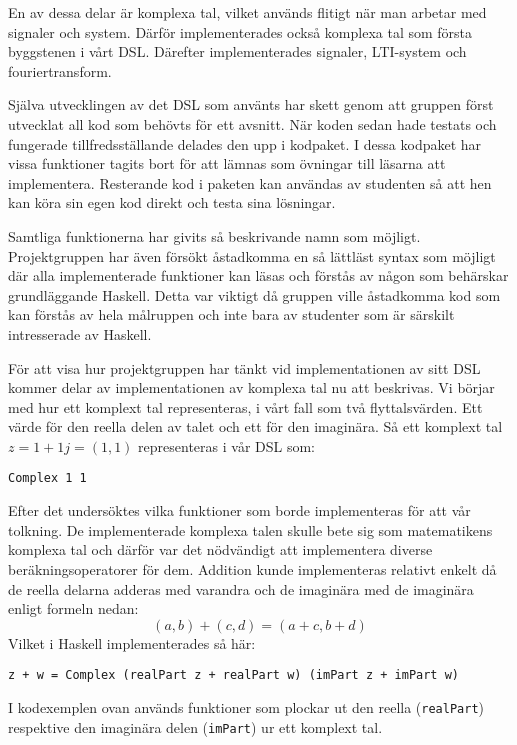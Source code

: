 \documentclass[]{article}
\begin{document}
En av dessa delar är komplexa tal, vilket används flitigt när man arbetar med
signaler och system. Därför implementerades också komplexa tal som första byggstenen
i vårt DSL. Därefter implementerades signaler, LTI-system och fouriertransform.

Själva utvecklingen av det DSL som använts har skett genom att gruppen först
utvecklat all kod som behövts för ett avsnitt. När koden sedan hade testats och
fungerade tillfredsställande delades den upp i kodpaket. I dessa kodpaket
har vissa funktioner tagits bort för att lämnas som övningar till läsarna att
implementera. Resterande kod i paketen kan användas av studenten så att hen kan köra sin egen kod direkt och
testa sina lösningar.

Samtliga funktionerna har givits så beskrivande namn som möjligt. Projektgruppen har även försökt åstadkomma en så
lättläst syntax som möjligt där alla implementerade funktioner kan läsas och förstås av någon som behärskar
grundläggande Haskell. Detta var viktigt då gruppen ville åstadkomma kod som kan förstås av hela målruppen och inte
bara av studenter som är särskilt intresserade av Haskell.


För att visa hur projektgruppen har tänkt vid implementationen av sitt DSL kommer delar av implementationen av komplexa
tal nu att beskrivas. Vi börjar med hur ett komplext tal representeras, i vårt fall som två flyttalsvärden.
Ett värde för den reella delen av talet och ett för den imaginära.
Så ett komplext tal \(z = 1 + 1j = (1,1) \) representeras i vår DSL som:

\begin{verbatim}
Complex 1 1
\end{verbatim}

Efter det undersöktes vilka funktioner som borde implementeras för att vår tolkning. De implementerade komplexa
talen skulle bete sig som matematikens komplexa tal och därför var det nödvändigt att implementera diverse
beräkningsoperatorer för dem. Addition kunde implementeras relativt enkelt då de reella delarna adderas med
varandra och de imaginära med de imaginära enligt formeln nedan:
\[(a, b) + (c, d) = (a + c, b + d)\] \cite{conway1978functions}
Vilket i Haskell implementerades så här:
\begin{verbatim}
z + w = Complex (realPart z + realPart w) (imPart z + imPart w)
\end{verbatim}

I kodexemplen ovan används funktioner som plockar ut den reella
(\texttt{realPart}) respektive den imaginära delen
(\texttt{imPart}) ur ett komplext tal.
\end{document}
